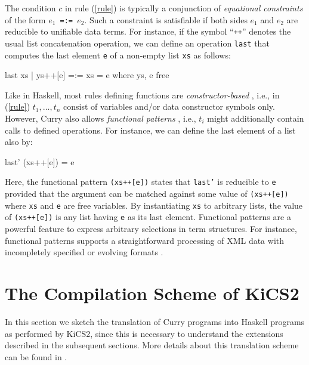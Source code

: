 \documentclass{llncs}
\newcommand{\code}[1]{\mbox{\small\texttt{#1}}}
\begin{document}
The condition $c$ in rule (\ref{rule}) is typically a
conjunction of \emph{equational constraints}
of the form \code{$e_1$\,=:=\,$e_2$}.
Such a constraint is satisfiable if
both sides $e_1$ and $e_2$ are reducible to unifiable data terms.
For instance, if the symbol ``\code{++}'' denotes the usual list
concatenation operation, we can define an operation \code{last}
that computes the last element \code{e} of a non-empty list \code{xs}
as follows:
%
\label{ex:last}
\begin{curry}
  last xs | ys++[e] =:= xs = e   where ys, e free
\end{curry}
%
Like in Haskell, most rules defining functions are \emph{constructor-based} 
\cite{ODonnell85}, i.e., in (\ref{rule})
$t_1,\ldots,t_n$ consist of variables and/or data constructor symbols
only.  However, Curry also allows \emph{functional patterns}
\cite{AntoyHanus05LOPSTR}, i.e., $t_i$ might additionally contain calls to
defined operations. For instance, we can define the last element
of a list also by:
%
\begin{curry}
  last' (xs++[e]) = e
\end{curry}
%
Here, the functional pattern \code{(xs++[e])}
states that \code{last'} is reducible
to \code{e} provided that the argument can be matched against
some value of \code{(xs++[e])} where \code{xs} and \code{e} are
free variables.
By instantiating \code{xs} to arbitrary lists, the value
of \code{(xs++[e])} is any list having \code{e} as its last element.
Functional patterns are
a powerful feature to express arbitrary selections in term structures.
For instance, functional patterns supports a straightforward
processing of XML data with incompletely specified
or evolving formats \cite{Hanus11ICLP}.



\section{The Compilation Scheme of KiCS2}
\label{sec:Compilation}

In this section we sketch the translation of Curry programs
into Haskell programs as performed by KiCS2,
since this is necessary to understand the extensions
described in the subsequent sections.
More details about this translation scheme can be found in
\cite{BrasselFischer08IFL,BrasselFischerHanusReck11}.
\end{document}
